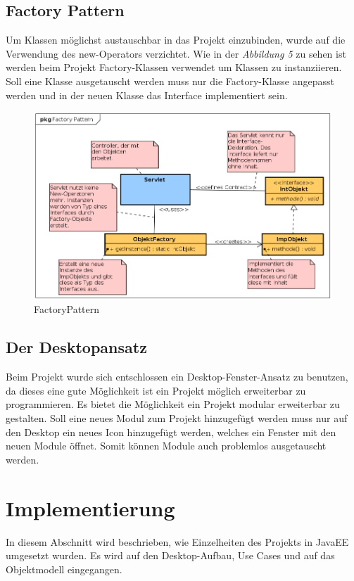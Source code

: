 \documentclass[12pt, a4paper]{article}
\begin{document}
\subsection{Factory Pattern}
Um Klassen möglichst austauschbar in das Projekt einzubinden, wurde auf die Verwendung des \glqq new-Operators\grqq{} verzichtet. Wie in der \textit{Abbildung 5} zu sehen ist werden beim Projekt \glqq Factory-Klassen\grqq{} verwendet um Klassen zu instanziieren. Soll eine Klasse ausgetauscht werden muss nur die Factory-Klasse angepasst werden und in der neuen Klasse das Interface implementiert sein.

\begin{figure}[H]
	\begin{center}
		\includegraphics[width=120mm]{Bilder/FactoryPattern.png}
	\end{center}
	\caption{FactoryPattern}
\end{figure}


\subsection{Der Desktopansatz}
Beim Projekt wurde sich entschlossen ein Desktop-Fenster-Ansatz zu benutzen, da dieses eine gute Möglichkeit ist ein Projekt möglich erweiterbar zu programmieren. Es bietet die Möglichkeit ein Projekt modular erweiterbar zu gestalten. Soll eine neues Modul zum Projekt hinzugefügt werden muss nur auf den Desktop ein neues Icon hinzugefügt werden, welches ein Fenster mit den neuen Module öffnet. Somit können Module auch problemlos ausgetauscht werden.

\pagebreak
\section{Implementierung}
In diesem Abschnitt wird beschrieben, wie Einzelheiten des Projekts in JavaEE umgesetzt wurden. Es wird auf den Desktop-Aufbau, Use Cases und auf das Objektmodell eingegangen.
\end{document}
